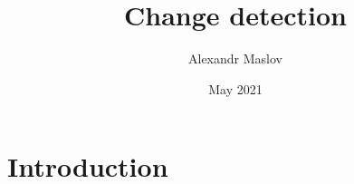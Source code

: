 \documentclass{article}
\title{Change detection}
\author{Alexandr Maslov}
\date{May 2021}
\begin{document}
\maketitle

\section{Introduction}
\end{document}
